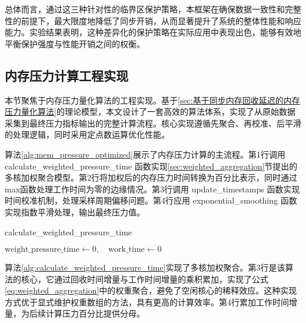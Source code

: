 总体而言，通过这三种针对性的临界区保护策略，本框架在确保数据一致性和完整性的前提下，最大限度地降低了同步开销，从而显著提升了系统的整体性能和响应能力。实验结果表明，这种差异化的保护策略在实际应用中表现出色，能够有效地平衡保护强度与性能开销之间的权衡。


\subsection{内存压力计算工程实现}
\label{sec:内存压力计算算法}

本节聚焦于内存压力量化算法的工程实现。基于\ref{sec:基于同步内存回收延迟的内存压力量化算法}的理论模型，本文设计了一套高效的算法体系，实现了从原始数据采集到最终压力指标输出的完整计算流程。核心实现遵循先聚合、再校准、后平滑的处理逻辑，同时采用定点数运算优化性能。

算法\ref{alg:mem_pressure_optimized}展示了内存压力计算的主流程。第1行调用\\
 calculate\_weighted\_pressure\_time 函数实现\ref{sec:weighted_aggregation}节提出的多核加权聚合模型。第2行将加权后的内存压力时间转换为百分比表示，同时通过max函数处理工作时间为零的边缘情况。第3行调用 update\_timestamps 函数实现时间校准机制，处理采样周期偏移问题。第4行应用 exponential\_smoothing 函数实现指数平滑处理，输出最终压力值。

\begin{algorithm}[htbp]
\caption{calculate\_weighted\_pressure\_time}
\label{alg:calculate_weighted_pressure_time}
\SetAlgoLined
\DontPrintSemicolon
{}
\(\text{weight\_pressure\_time} \gets 0,\quad \text{work\_time} \gets 0\)\;
\end{algorithm}

算法\ref{alg:calculate_weighted_pressure_time}实现了多核加权聚合。第3行是该算法的核心，它通过回收时间增量与工作时间增量的乘积累加，实现了公式\ref{eq:weighted_aggregation}中的权重聚合，避免了空闲核心的稀释效应。这种实现方式优于显式维护权重数组的方法，具有更高的计算效率。第4行累加工作时间增量，为后续计算压力百分比提供分母。


